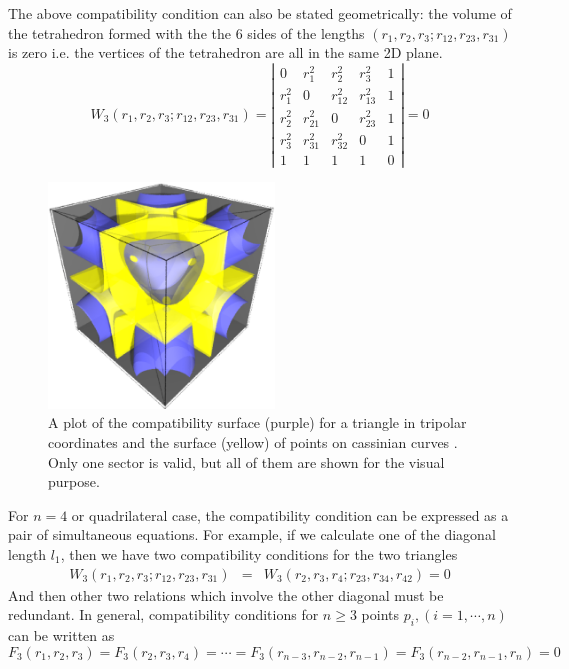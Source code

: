 \documentclass{article}
\begin{document}
The above compatibility condition can also be stated geometrically: the volume of the tetrahedron formed with the the 6 sides of the lengths \((r_1,r_2,r_3;r_{12},r_{23},r_{31})\) is zero i.e. the vertices of the tetrahedron are all in the same 2D plane. 
\begin{equation}
\label{}
W_3(r_1,r_2,r_3;r_{12},r_{23},r_{31}) =\left|\begin{array}{ccccc}
0 &  r_{1}^2 & r_{2}^2 & r_{3}^2 & 1 \\
r_{1}^2 &  0 & r_{12}^2 & r_{13}^2 & 1 \\
r_{2}^2 &  r_{21}^2 & 0 & r_{23}^2 & 1 \\
r_{3}^2 &  r_{31}^2 & r_{32}^2 & 0 & 1 \\
 1 & 1 & 1 & 1 & 0  
\end{array}\right|=0
\end{equation} 
\begin{figure}[H]
\begin{center}
\includegraphics[width=6cm]{images/compatibility_tripolar.eps}
\caption{A plot of the compatibility surface (purple) for a triangle in tripolar coordinates and the surface (yellow) of points on cassinian curves . Only one sector is valid, but all of them are shown for the visual purpose.}
\label{fig:compat_tripol}
\end{center}
\end{figure}
For \(n=4\) or quadrilateral case, the compatibility condition can be expressed as a pair of simultaneous equations.
 For example, if we calculate one of the diagonal length \(l_1\), then we have two compatibility conditions for the two triangles
\begin{eqnarray}
W_3(r_1,r_2,r_3;r_{12},r_{23},r_{31})  & = & W_3(r_2,r_3,r_4;r_{23},r_{34},r_{42})   =  0   
\end{eqnarray}
And then other two relations which involve the other diagonal must be redundant.
In general, compatibility conditions for \(n \ge 3\) points \(p_i, (i=1,\cdots,n)\) can be written as
\begin{equation}
\label{}
F_3(r_1,r_2,r_3) =  F_3(r_2,r_3,r_4) = \cdots = F_3(r_{n-3},r_{n-2},r_{n-1})= F_3(r_{n-2},r_{n-1},r_{n})=0
\end{equation}
\end{document}
